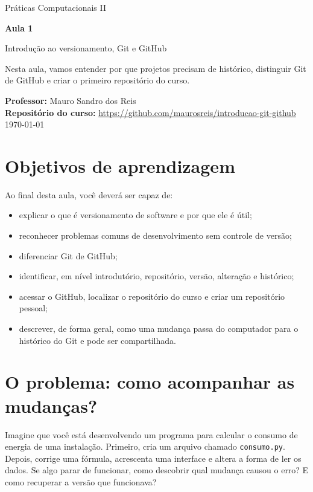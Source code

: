 \documentclass[12pt,a4paper]{article}
\begin{document}
\begin{titlepage}
\centering\vspace*{2.2cm}
{\Large Práticas Computacionais II\par}\vspace{1.5cm}
{\Huge\bfseries\color{azul} Aula 1\par}\vspace{.4cm}
{\LARGE Introdução ao versionamento, Git e GitHub\par}\vspace{1.5cm}
\begin{tcolorbox}[width=.86\textwidth,colback=azulclaro,colframe=azul,arc=2mm]
Nesta aula, vamos entender por que projetos precisam de histórico, distinguir Git de GitHub e criar o primeiro repositório do curso.
\end{tcolorbox}
\vfill
\textbf{Professor:} Mauro Sandro dos Reis\\[.3cm]
\textbf{Repositório do curso:} \url{https://github.com/maurosreis/introducao-git-github}\\[.5cm]
\today
\end{titlepage}
\tableofcontents\newpage

\section{Objetivos de aprendizagem}
Ao final desta aula, você deverá ser capaz de:
\begin{itemize}
\item explicar o que é versionamento de software e por que ele é útil;
\item reconhecer problemas comuns de desenvolvimento sem controle de versão;
\item diferenciar Git de GitHub;
\item identificar, em nível introdutório, repositório, versão, alteração e histórico;
\item acessar o GitHub, localizar o repositório do curso e criar um repositório pessoal;
\item descrever, de forma geral, como uma mudança passa do computador para o histórico do Git e pode ser compartilhada.
\end{itemize}

\section{O problema: como acompanhar as mudanças?}
Imagine que você está desenvolvendo um programa para calcular o consumo de energia de uma instalação. Primeiro, cria um arquivo chamado \texttt{consumo.py}. Depois, corrige uma fórmula, acrescenta uma interface e altera a forma de ler os dados. Se algo parar de funcionar, como descobrir qual mudança causou o erro? E como recuperar a versão que funcionava?
\end{document}
